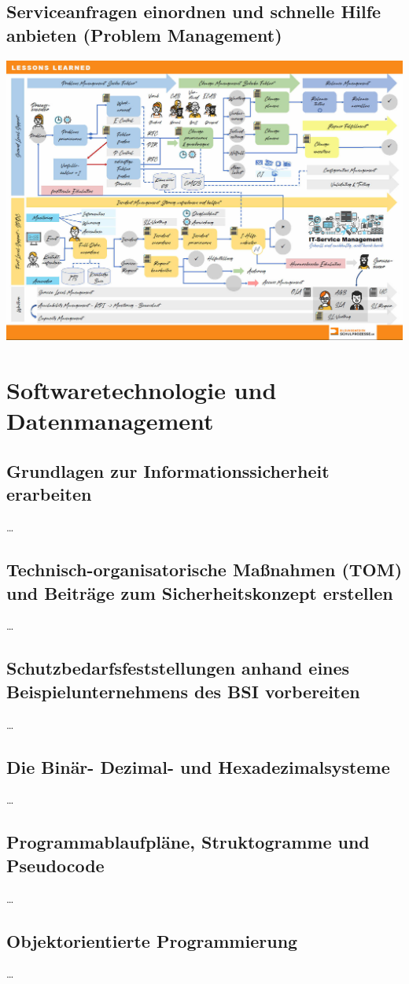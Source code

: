 \documentclass[a4paper, 12pt]{report}
\begin{document}
\section{Serviceanfragen einordnen und schnelle Hilfe anbieten (Problem Management)}
\centering
\includegraphics[width=16cm]{serviceanfragen_bearbeiten.jpg}


\chapter{Softwaretechnologie und Datenmanagement}
\begin{multicols}{2}

\section{Grundlagen zur Informationssicherheit erarbeiten}
\dots

\section{Technisch-organisatorische Maßnahmen (TOM) und Beiträge zum Sicherheitskonzept erstellen}
\dots

\section{Schutzbedarfsfeststellungen anhand eines Beispielunternehmens des BSI vorbereiten}
\dots

\section{Die Binär- Dezimal- und Hexadezimalsysteme}
\dots

\section{Programmablaufpläne, Struktogramme und Pseudocode}
\dots

\section{Objektorientierte Programmierung}
\dots
\end{multicols}
\end{document}
